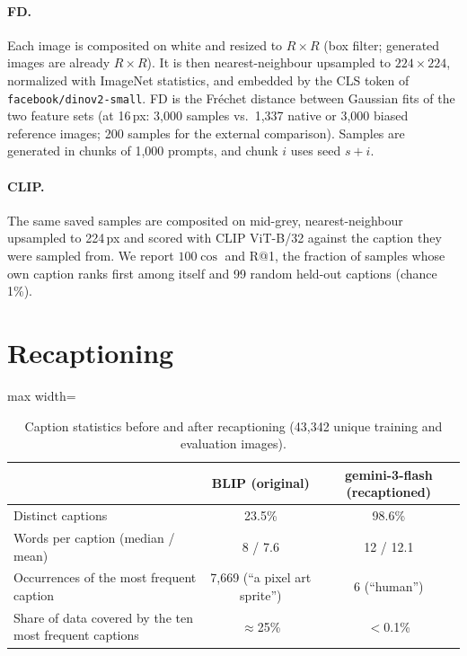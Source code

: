 \paragraph{FD.} Each image is composited on white and resized to $R\times R$ (box filter; generated images are already
$R\times R$). It is then nearest-neighbour upsampled to $224\times224$, normalized with ImageNet statistics, and embedded
by the CLS token of \texttt{facebook/dinov2-small}. FD is the Fréchet distance between Gaussian fits of the two feature
sets (at 16\,px: 3,000 samples vs.\ 1,337 native or 3,000 biased reference images; 200 samples for the external
comparison). Samples are generated in chunks of 1,000 prompts, and chunk $i$ uses seed $s + i$.

\paragraph{CLIP.} The same saved samples are composited on mid-grey, nearest-neighbour upsampled to 224\,px and scored
with CLIP ViT-B/32 against the caption they were sampled from. We report $100\cos$ and R@1, the fraction of samples
whose own caption ranks first among itself and 99 random held-out captions (chance 1\%).

\section{Recaptioning}
\label{app:recap}

\begin{table}[h]
\caption{Caption statistics before and after recaptioning (43,342 unique training and evaluation images).}
\label{tab:recap}
\centering
\small
\begin{adjustbox}{max width=\linewidth}
\begin{tabular}{@{}lcc@{}}
\toprule
 & BLIP \citep{Li2022blip} (original) & gemini-3-flash \citep{Gemini3} (recaptioned) \\
\midrule
Distinct captions & 23.5\% & 98.6\% \\
Words per caption (median / mean) & 8 / 7.6 & 12 / 12.1 \\
Occurrences of the most frequent caption & 7,669 (``a pixel art sprite'') & 6 (``human'') \\
Share of data covered by the ten most frequent captions & $\approx$25\% & $<$0.1\% \\
\bottomrule
\end{tabular}
\end{adjustbox}
\end{table}

